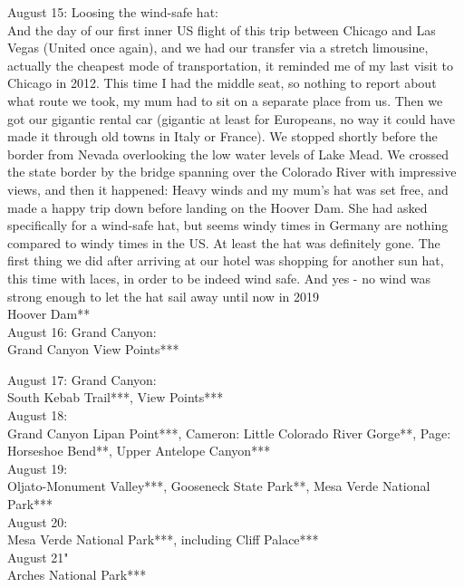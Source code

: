 August 15: Loosing the wind-safe hat: \\
And the day of our first inner US flight of this trip between Chicago and Las Vegas (United once again), and we had our transfer via a stretch limousine, actually the cheapest mode of transportation, it reminded me of my last visit to Chicago in 2012. This time I had the middle seat, so nothing to report about what route we took, my mum had to sit on a separate place from us. Then we got our gigantic rental car (gigantic at least for Europeans, no way it could have made it through old towns in Italy or France). We stopped shortly before the border from Nevada overlooking the low water levels of Lake Mead. We crossed the state border by the bridge spanning over the Colorado River with impressive views, and then it happened: Heavy winds and my mum's hat was set free, and made a happy trip down before landing on the Hoover Dam. She had asked specifically for a wind-safe hat, but seems windy times in Germany are nothing compared to windy times in the US. At least the hat was definitely gone. The first thing we did after arriving at our hotel was shopping for another sun hat, this time with laces, in order to be indeed wind safe. And yes - no wind was strong enough to let the hat sail away until now in 2019\\

Hoover Dam**\\

August 16: Grand Canyon:\\
Grand Canyon View Points***

August 17: Grand Canyon:\\
South Kebab Trail***, View Points***\\

August 18:\\
Grand Canyon Lipan Point***, Cameron: Little Colorado River Gorge**, Page: Horseshoe Bend**, Upper Antelope Canyon***\\

August 19:\\
Oljato-Monument Valley***, Gooseneck State Park**, Mesa Verde National Park***\\

August 20:\\
Mesa Verde National Park***, including Cliff Palace***\\

August 21"\\
Arches National Park***\\

